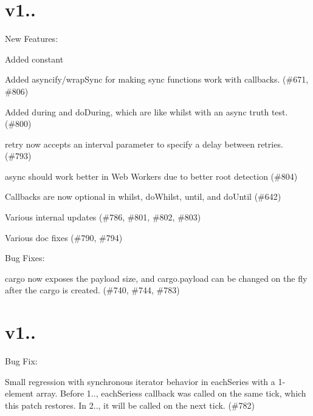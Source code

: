 \section*{v1..}

New Features\+:
\begin{DoxyItemize}
\item Added {\ttfamily constant}
\item Added {\ttfamily asyncify}/{\ttfamily wrap\+Sync} for making sync functions work with callbacks. (\#671, \#806)
\item Added {\ttfamily during} and {\ttfamily do\+During}, which are like {\ttfamily whilst} with an async truth test. (\#800)
\item {\ttfamily retry} now accepts an {\ttfamily interval} parameter to specify a delay between retries. (\#793)
\item {\ttfamily async} should work better in Web Workers due to better {\ttfamily root} detection (\#804)
\item Callbacks are now optional in {\ttfamily whilst}, {\ttfamily do\+Whilst}, {\ttfamily until}, and {\ttfamily do\+Until} (\#642)
\item Various internal updates (\#786, \#801, \#802, \#803)
\item Various doc fixes (\#790, \#794)
\end{DoxyItemize}

Bug Fixes\+:
\begin{DoxyItemize}
\item {\ttfamily cargo} now exposes the {\ttfamily payload} size, and {\ttfamily cargo.\+payload} can be changed on the fly after the {\ttfamily cargo} is created. (\#740, \#744, \#783)
\end{DoxyItemize}

\section*{v1..}

Bug Fix\+:


\begin{DoxyItemize}
\item Small regression with synchronous iterator behavior in {\ttfamily each\+Series} with a 1-\/element array. Before 1.., {\ttfamily each\+Series}\textquotesingle{}s callback was called on the same tick, which this patch restores. In 2.., it will be called on the next tick. (\#782)
\end{DoxyItemize}

